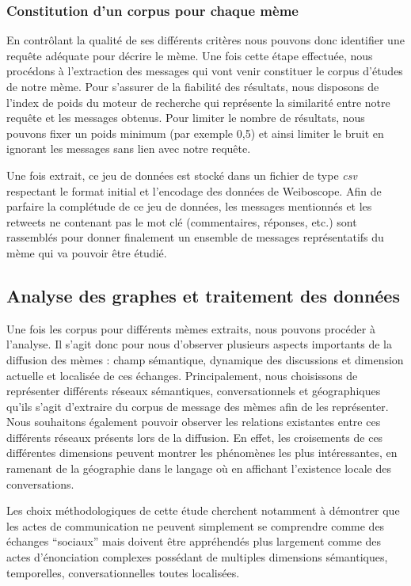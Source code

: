 \subsubsection[Constitution d'un corpus pour chaque mème]{Constitution d'un corpus pour chaque mème}

    En contrôlant la qualité de ses différents critères nous pouvons donc identifier une requête adéquate pour décrire le mème. Une fois cette étape effectuée, nous procédons à l'extraction des messages qui vont venir constituer le corpus d'études de notre mème. Pour s'assurer de la fiabilité des résultats, nous disposons de l'index de poids du moteur de recherche qui représente la similarité entre notre requête et les messages obtenus. Pour limiter le nombre de résultats, nous pouvons fixer un poids minimum (par exemple 0,5) et ainsi limiter le bruit en ignorant les messages sans lien avec notre requête.

    Une fois extrait, ce jeu de données est stocké dans un fichier de type  \textit{csv} respectant le format initial et l'encodage des données de Weiboscope. Afin de parfaire la complétude de ce jeu de données, les messages mentionnés et les retweets ne contenant pas le mot clé (commentaires, réponses, etc.) sont rassemblés pour donner finalement un ensemble de messages représentatifs du mème qui va pouvoir être étudié.


\subsection[Analyse des graphes et traitement des données]{Analyse des graphes et traitement des données}

    Une fois les corpus pour différents mèmes extraits, nous pouvons procéder à l'analyse. Il s'agit donc pour nous d'observer plusieurs aspects importants de la diffusion des mèmes : champ sémantique, dynamique des discussions et dimension actuelle et localisée de ces échanges. Principalement, nous choisissons de représenter différents réseaux sémantiques, conversationnels et géographiques qu'ils s'agit d'extraire du corpus de message des mèmes afin de les représenter. Nous souhaitons également  pouvoir observer les relations existantes entre ces différents réseaux présents lors de la diffusion. En effet, les croisements de ces différentes dimensions peuvent montrer les phénomènes les plus intéressantes, en ramenant de la géographie dans le langage où en affichant l'existence locale des conversations.

    Les choix méthodologiques de cette étude cherchent notamment à démontrer que les actes de communication ne peuvent simplement se comprendre comme des échanges {\textquotedblleft}sociaux{\textquotedblright} mais doivent être appréhendés plus largement comme des actes d{\textquoteright}énonciation complexes possédant de multiples dimensions sémantiques, temporelles, conversationnelles toutes localisées.

